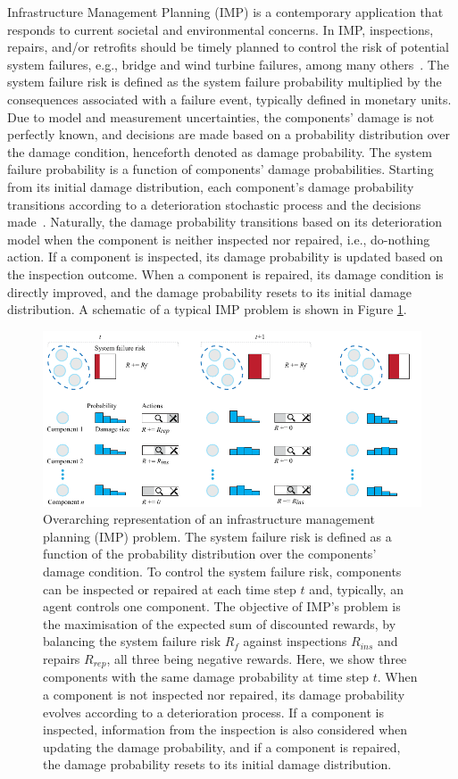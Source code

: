 Infrastructure Management Planning (IMP) is a contemporary application that responds to current societal and environmental concerns.
In IMP, inspections, repairs, and/or retrofits should be timely planned to control the risk of potential system failures, e.g., bridge and wind turbine failures, among many others~\citep{morato2022optimal}.
The system failure risk is defined as the system failure probability multiplied by the consequences associated with a failure event, typically defined in monetary units.
Due to model and measurement uncertainties, the components' damage is not perfectly known, and decisions are made based on a probability distribution over the damage condition, henceforth denoted as damage probability.
The system failure probability is a function of components' damage probabilities.
Starting from its initial damage distribution, each component's damage probability transitions according to a deterioration stochastic process and the decisions made~\citep{morato2022optimal}.
Naturally, the damage probability transitions based on its deterioration model when the component is neither inspected nor repaired, i.e., do-nothing action.
If a component is inspected, its damage probability is updated based on the inspection outcome.
When a component is repaired, its damage condition is directly improved, and the damage probability resets to its initial damage distribution.
A schematic of a typical IMP problem is shown in Figure \ref{fig:ch5_imp_problem}.

\begin{figure}
\centering
\includegraphics[width=\textwidth]{tex_thesis/figures/ch5/imp_intro.pdf}
\caption{Overarching representation of an infrastructure management planning (IMP) problem.
The system failure risk is defined as a function of the probability distribution over the components' damage condition. 
To control the system failure risk, components can be inspected or repaired at each time step $t$ and, typically, an agent controls one component.
The objective of IMP's problem is the maximisation of the expected sum of discounted rewards, by balancing the system failure risk $R_f$ against inspections $R_{ins}$ and repairs $R_{rep}$, all three being negative rewards.
Here, we show three components with the same damage probability at time step $t$.
When a component is not inspected nor repaired, its damage probability evolves according to a deterioration process. If a component is inspected, information from the inspection is also considered when updating the damage probability, and if a component is repaired, the damage probability resets to its initial damage distribution.}
\label{fig:ch5_imp_problem}
\end{figure}

